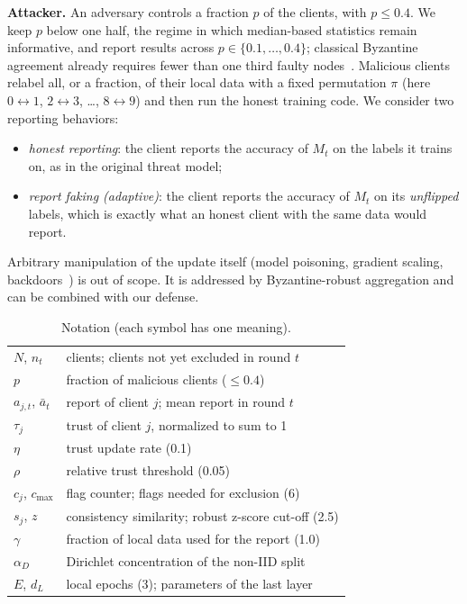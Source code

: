 \documentclass[conference]{IEEEtran}
\begin{document}
\textbf{Attacker.} An adversary controls a fraction $p$ of the clients, with $p\le 0.4$. We keep $p$ below one half, the regime in which median-based statistics remain informative, and report results across $p\in\{0.1,\dots,0.4\}$; classical Byzantine agreement already requires fewer than one third faulty nodes~\cite{lamport1982byzantine}. Malicious clients relabel all, or a fraction, of their local data with a fixed permutation $\pi$ (here $0{\leftrightarrow}1$, $2{\leftrightarrow}3$, \dots, $8{\leftrightarrow}9$) and then run the honest training code. We consider two reporting behaviors:
\begin{itemize}
\item \emph{honest reporting}: the client reports the accuracy of $M_t$ on the labels it trains on, as in the original threat model;
\item \emph{report faking (adaptive)}: the client reports the accuracy of $M_t$ on its \emph{unflipped} labels, which is exactly what an honest client with the same data would report.
\end{itemize}
Arbitrary manipulation of the update itself (model poisoning, gradient scaling, backdoors~\cite{bagdasaryan2020backdoor,fang2020local}) is out of scope. It is addressed by Byzantine-robust aggregation and can be combined with our defense.

\begin{table}[t]
\centering
\caption{Notation (each symbol has one meaning).}
\label{tab:notation}
\footnotesize
\begin{tabular}{ll}
\hline
$N$, $n_t$ & clients; clients not yet excluded in round $t$ \\
$p$ & fraction of malicious clients ($\le 0.4$) \\
$a_{j,t}$, $\bar a_t$ & report of client $j$; mean report in round $t$ \\
$\tau_j$ & trust of client $j$, normalized to sum to 1 \\
$\eta$ & trust update rate (0.1) \\
$\rho$ & relative trust threshold (0.05) \\
$c_j$, $c_{\max}$ & flag counter; flags needed for exclusion (6) \\
$s_j$, $z$ & consistency similarity; robust z-score cut-off (2.5) \\
$\gamma$ & fraction of local data used for the report (1.0) \\
$\alpha_D$ & Dirichlet concentration of the non-IID split \\
$E$, $d_L$ & local epochs (3); parameters of the last layer \\
\hline
\end{tabular}
\end{table}
\end{document}
